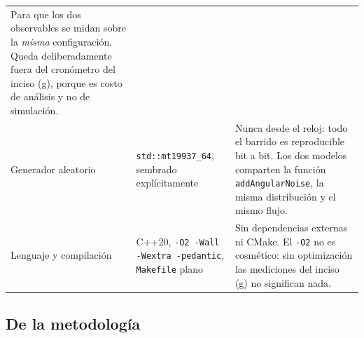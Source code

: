 \documentclass[11pt]{article}
\begin{document}
\begin{center}
\begin{tabular}{p{3.5cm}p{4.4cm}p{5.6cm}}
  Para que los dos observables se midan sobre la \emph{misma} configuración. Queda deliberadamente fuera del cronómetro del inciso (g), porque es costo de análisis y no de simulación. \\
  \addlinespace
  Generador aleatorio &
  \texttt{std::mt19937\_64}, sembrado explícitamente &
  Nunca desde el reloj: todo el barrido es reproducible bit a bit. Los dos modelos comparten la función \texttt{addAngularNoise}, la misma distribución y el mismo flujo. \\
  \addlinespace
  Lenguaje y compilación &
  C++20, \texttt{-O2 -Wall -Wextra -pedantic}, \texttt{Makefile} plano &
  Sin dependencias externas ni CMake. El \texttt{-O2} no es cosmético: sin optimización las mediciones del inciso (g) no significan nada. \\
  \bottomrule
\end{tabular}
\end{center}

\subsection{De la metodología}
\end{document}
